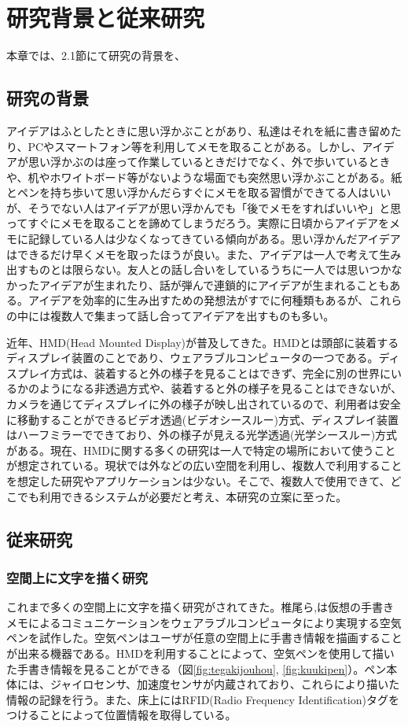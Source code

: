 \documentclass[11pt,a4j, titlepage]{jarticle} %
\begin{document}
\newpage
\section{研究背景と従来研究}
本章では、2.1節にて研究の背景を、

\subsection{研究の背景}
アイデアはふとしたときに思い浮かぶことがあり、私達はそれを紙に書き留めたり、PCやスマートフォン等を利用してメモを取ることがある。しかし、アイデアが思い浮かぶのは座って作業しているときだけでなく、外で歩いているときや、机やホワイトボード等がないような場面でも突然思い浮かぶことがある。紙とペンを持ち歩いて思い浮かんだらすぐにメモを取る習慣ができてる人はいいが、そうでない人はアイデアが思い浮かんでも「後でメモをすればいいや」と思ってすぐにメモを取ることを諦めてしまうだろう。実際に日頃からアイデアをメモに記録している人は少なくなってきている傾向がある\cite{memo}。思い浮かんだアイデアはできるだけ早くメモを取ったほうが良い。また、アイデアは一人で考えて生み出すものとは限らない。友人との話し合いをしているうちに一人では思いつかなかったアイデアが生まれたり、話が弾んで連鎖的にアイデアが生まれることもある。アイデアを効率的に生み出すための発想法がすでに何種類もあるが、これらの中には複数人で集まって話し合ってアイデアを出すものも多い\cite{hassouhou}。

近年、HMD(Head Mounted Display)が普及してきた。HMDとは頭部に装着するディスプレイ装置のことであり、ウェアラブルコンピュータの一つである。ディスプレイ方式は、装着すると外の様子を見ることはできず、完全に別の世界にいるかのようになる非透過方式や、装着すると外の様子を見ることはできないが、カメラを通じてディスプレイに外の様子が映し出されているので、利用者は安全に移動することができるビデオ透過(ビデオシースルー)方式、ディスプレイ装置はハーフミラーでできており、外の様子が見える光学透過(光学シースルー)方式がある。現在、HMDに関する多くの研究は一人で特定の場所において使うことが想定されている。現状では外などの広い空間を利用し、複数人で利用することを想定した研究やアプリケーションは少ない。そこで、複数人で使用できて、どこでも利用できるシステムが必要だと考え、本研究の立案に至った。

\subsection{従来研究}
\subsubsection{空間上に文字を描く研究}
これまで多くの空間上に文字を描く研究がされてきた。椎尾ら\cite{siio},\cite{siio2}は仮想の手書きメモによるコミュニケーションをウェアラブルコンピュータにより実現する空気ペンを試作した。空気ペンはユーザが任意の空間上に手書き情報を描画することが出来る機器である。HMDを利用することによって、空気ペンを使用して描いた手書き情報を見ることができる（図\ref{fig:tegakijouhou}, \ref{fig:kuukipen}）。ペン本体には、ジャイロセンサ、加速度センサが内蔵されており、これらにより描いた情報の記録を行う。また、床上にはRFID(Radio Frequency Identification)タグをつけることによって位置情報を取得している。
\end{document}
